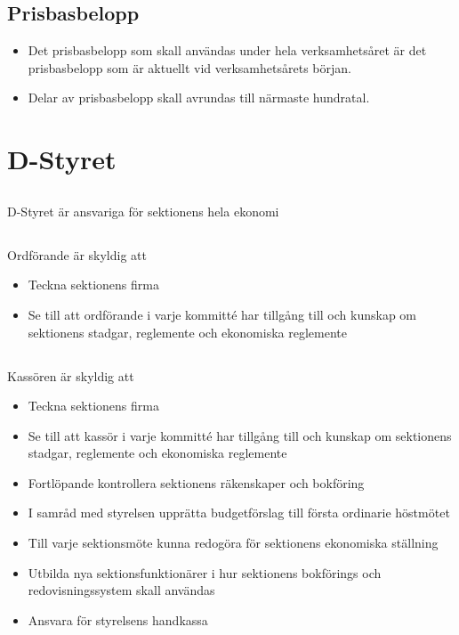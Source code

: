 \documentclass[a4paper, 10pt]{article}
\begin{document}
\subsection{Prisbasbelopp}
\begin{itemize}
  \item Det prisbasbelopp som skall användas under hela verksamhetsåret är det prisbasbelopp som är aktuellt vid verksamhetsårets början.
  \item Delar av prisbasbelopp skall avrundas till närmaste hundratal. 
\end{itemize}

\section{D-Styret}
\subsection{}
D-Styret är ansvariga för sektionens hela ekonomi
\subsection{}
Ordförande är skyldig att
\begin{itemize}
  \item Teckna sektionens firma
  \item Se till att ordförande i varje kommitté har tillgång till och kunskap om sektionens stadgar, reglemente och ekonomiska reglemente 
\end{itemize}
\subsection{}
Kassören är skyldig att
\begin{itemize}
  \item Teckna sektionens firma
  \item Se till att kassör i varje kommitté har tillgång till och kunskap om sektionens stadgar, reglemente och ekonomiska reglemente 
  \item Fortlöpande kontrollera sektionens räkenskaper och bokföring
  \item I samråd med styrelsen upprätta budgetförslag till första ordinarie höstmötet
  \item Till varje sektionsmöte kunna redogöra för sektionens ekonomiska ställning
  \item Utbilda nya sektionsfunktionärer i hur sektionens bokförings och redovisningssystem skall användas
  \item Ansvara för styrelsens handkassa
\end{itemize}
\end{document}
